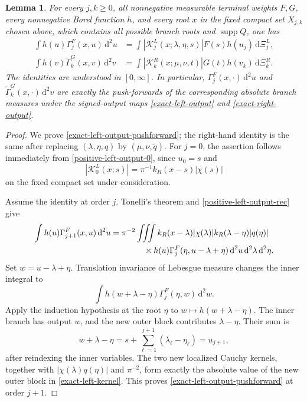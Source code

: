 \documentclass[a4paper,11pt]{article}
\newcommand{\dd}{\,\text{d}}
\theoremstyle{plain}
\newtheorem{lem}[thm]{Lemma}
\theoremstyle{definition}
\theoremstyle{remark}
\begin{document}
\begin{lem}
\label{lem-exact-output-pushforward}
For every $j,k\ge0$, all nonnegative measurable terminal weights $F,G$, every
nonnegative Borel function $h$, and every root $x$ in the fixed compact set $X_{j,k}$ chosen above, which
contains all possible branch roots and $\operatorname{supp}Q$, one has
\begin{align}
\int h(u)\Gamma_j^F(x,u)\dd^2u
&=\int
 |\mathcal K_j^L(x;\lambda,\eta,s)|F(s)h(u_j)
 \dd\Xi_j^L,
\label{exact-left-output-pushforward}\\
\int h(v)\widetilde\Gamma_k^G(x,v)\dd^2v
&=\int
 |\mathcal K_k^R(x;\mu,\nu,t)|G(t)h(v_k)
 \dd\Xi_k^R.
\label{exact-right-output-pushforward}
\end{align}
The identities are understood in $[0,\infty]$.  In particular,
$\Gamma_j^F(x,\cdot)\dd^2u$ and
$\widetilde\Gamma_k^G(x,\cdot)\dd^2v$ are exactly the push-forwards of
the corresponding absolute branch measures under the signed-output maps
\eqref{exact-left-output} and \eqref{exact-right-output}.
\end{lem}

\begin{proof}
We prove \eqref{exact-left-output-pushforward}; the right-hand identity is the
same after replacing $(\lambda,\eta,q)$ by
$(\mu,\nu,\widetilde q)$.  For $j=0$, the assertion follows immediately
from \eqref{positive-left-output-0}, since $u_0=s$ and
\[
 |\mathcal K_0^L(x;s)|=\pi^{-1}k_R(x-s)|\chi(s)|
\]
on the fixed compact set under consideration.

Assume the identity at order $j$.  Tonelli's theorem and
\eqref{positive-left-output-rec} give
\begin{align*}
\int h(u)\Gamma_{j+1}^F(x,u)\dd^2u
&=\pi^{-2}\iiint
 k_R(x-\lambda)|\chi(\lambda)|
 k_R(\lambda-\eta)|q(\eta)|\,\notag\\
&\qquad\qquad\times
 h(u)\Gamma_j^F(\eta,u-\lambda+\eta)
 \dd^2u\dd^2\lambda\dd^2\eta.
\end{align*}
Set $w=u-\lambda+\eta$.  Translation invariance of Lebesgue measure changes
the inner integral to
\[
 \int h(w+\lambda-\eta)\Gamma_j^F(\eta,w)\dd^2w.
\]
Apply the induction hypothesis at the root $\eta$ to $w\mapsto h(w+\lambda-\eta)$.  The inner branch has output $w$, and the new outer block contributes $\lambda-\eta$.  Their sum is
\[
 w+\lambda-\eta
 =s+\sum_{\ell=1}^{j+1}(\lambda_\ell-\eta_\ell)
 =u_{j+1},
\]
after reindexing the inner variables.  The two new localized Cauchy kernels, together with $|\chi(\lambda)q(\eta)|$ and $\pi^{-2}$, form exactly the absolute value of the new outer block in \eqref{exact-left-kernel}.  This proves \eqref{exact-left-output-pushforward} at order $j+1$.
\end{proof}
\end{document}
